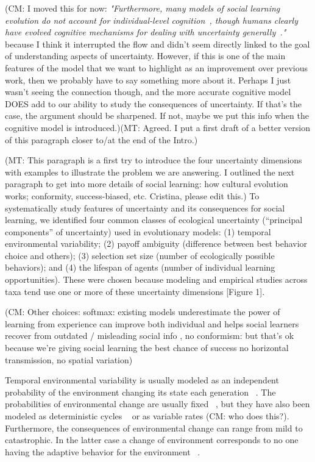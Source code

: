 \documentclass[letterpaper,11.5pt]{scrartcl}
\newcommand{\mt}[1]{{\textcolor{myorange} {({\tiny MT:} #1)}}}
\newcommand{\cm}[1]{{\textcolor{mypurple} {({\tiny CM:} #1)}}}
\begin{document}
 \cm{I moved this for now: \emph{"Furthermore, many models of social learning evolution do not account for individual-level
cognition~\cite{Heyes2016}, though humans clearly have evolved cognitive mechanisms
for dealing with uncertainty generally~\cite{Gershman2019,Schulz2019}."} because I think it interrupted the flow and didn't seem directly linked to the goal of understanding aspects of uncertainty. However, if this is one of the main features of the model that we want to highlight as an improvement over previous work, then we probably have to say something more about it. Perhaps I just wasn't seeing the connection though, and the more accurate cognitive model DOES add to our ability to study the consequences of uncertainty. If that's the case, the argument should be sharpened. If not, maybe we put this info when the cognitive model is introduced.}\mt{Agreed. I put a first draft of a better version of this paragraph closer to/at the end of the Intro.}


\mt{This paragraph is a first try to introduce the four uncertainty dimensions
with examples to illustrate the problem we are answering.
I outlined the next paragraph to get into more details of social learning:
how cultural evolution works; conformity, success-biased, etc. Cristina, please
edit this.} 
To systematically study features of uncertainty and its consequences for social learning, we identified four common classes of ecological uncertainty (``principal components'' of uncertainty) used in evolutionary models: (1) temporal environmental variability; (2) payoff
ambiguity (difference between best behavior choice and others); (3) 
selection set size (number of ecologically possible behaviors); and 
(4) the lifespan of agents (number of individual learning opportunities).
These were chosen because modeling and empirical 
studies across taxa tend use one or more of these uncertainty dimensions [Figure 1].

\cm{Other choices: softmax: existing models underestimate the power of learning from experience can improve both individual and helps social learners recover from outdated / misleading social info , no conformism: but that's ok because we're giving social learning the best chance of success 
no horizontal transmission, no spatial variation}


Temporal environmental variability is usually modeled as an independent probability of the environment changing its state each generation ~\cite{Feldman1996,McElreath2005}. The probabilities of environmental change are usually fixed ~\cite{BoydRicherson1985, Kendal2009}, but they have also been modeled as deterministic cycles ~\cite{Feldman1996} or as variable rates \cm{who does this?}. Furthermore, the consequences of environmental change can range from mild to  catastrophic. In the latter case a change of environment corresponds to no one having the adaptive behavior for the environment ~\cite{Rogers1988}. 
\end{document}
